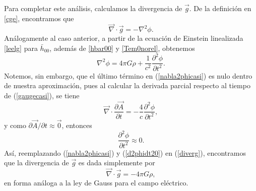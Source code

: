 Para completar este análisis, calculamos la divergencia de $\vec{g}$. De la definición en \eqref{cge}, encontramos que
\begin{equation}
\vec{\nabla}\cdot\vec{g}=-{\nabla}^2\phi.\label{diverg}
\end{equation}
Análogamente al caso anterior, a partir de la ecuación de Einstein linealizada \eqref{leelg} para $\bar{h}_{00}$, además de \eqref{hbar00} y \eqref{Tem0norel}, obtenemos
\begin{equation}
{\nabla}^2\phi=4\pi G\rho +\frac{1}{c^2}\frac{\partial^2 \phi}{\partial t^2}.\label{nabla2phicasi}
\end{equation}
Notemos, sin embargo, que el último término en (\ref{nabla2phicasi}) es nulo dentro de nuestra aproximación, pues al calcular la derivada parcial respecto al tiempo de (\ref{gaugecasi}), se tiene
\begin{equation}
\vec{\nabla}\cdot\frac{\partial \vec{A}}{\partial t}=-\frac{4}{c}\frac{\partial^2\phi}{\partial t^2},
\end{equation}
y como $\partial \vec{A}/\partial t\approx\vec{0}$, entonces
\begin{equation}
\frac{\partial^2\phi}{\partial t^2}\approx 0.\label{d2phidt20}
\end{equation}
Así, reemplazando (\ref{nabla2phicasi}) y (\ref{d2phidt20}) en (\ref{diverg}), encontramos que la divergencia de $\vec{g}$ es dada simplemente por
\begin{equation}
\vec{\nabla}\cdot\vec{g}=-4\pi G\rho ,
\end{equation}
en forma análoga a la ley de Gauss para el campo eléctrico.

